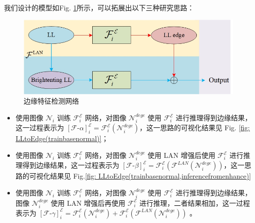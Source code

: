 \documentclass[a4paper]{ctexart}
\begin{document}
		我们设计的模型如Fig. \ref{fig: DCMP}所示，可以拓展出以下三种研究思路：
		
		\begin{figure}[htbp]
			\centering
			\includegraphics[width=0.5\linewidth]{picture/Edge Detection/DCMP}
			\caption{边缘特征检测网络}
			\label{fig: DCMP}
		\end{figure}
		
		\begin{itemize}
			\item[1)]
			使用图像 $\mathcal{N}_{i}$ 训练 $\mathcal{F}_{i}^{\mathcal{E}}$ 网络，对图像 $\mathcal{N}_{i}^{dege}$ 使用 $\mathcal{F}_{i}^{\mathcal{E}}$ 进行推理得到边缘结果，这一过程表示为 ${\left[\mathcal{F}\text{-}\alpha\right]}^{\mathcal{E}}_i = {\mathcal{F}}^\mathcal{E}_{i} (\mathcal{N}_{i}^{dege})$，这一思路的可视化结果见 Fig. \ref{fig: LLtoEdge(trainbasenormal)}；
			
			\item[2)]
			使用图像 $\mathcal{N}_{i}$ 训练 $\mathcal{F}_{i}^{\mathcal{E}}$ 网络，对图像 $\mathcal{N}_{i}^{dege}$ 使用 LAN 增强后使用 $\mathcal{F}_{i}^{\mathcal{E}}$ 进行推理得到边缘结果，这一过程表示为 ${\left[\mathcal{F}\text{-}\beta\right]}^{\mathcal{E}}_i =  \mathcal{F}_{i}^{\mathcal{E}} \left(\mathcal{F}^{LAN} (\mathcal{N}_{i}^{dege})\right)$，这一思路的可视化结果见 Fig.\ref{fig: LLtoEdge(trainbasenormal,inferencefromenhance)}
			
			\item[3)]
			使用图像 $\mathcal{N}_{i}$ 训练 $\mathcal{F}_{i}^{\mathcal{E}}$ 网络，对图像 $\mathcal{N}_{i}^{dege}$ 使用 $\mathcal{F}_{i}^{\mathcal{E}}$ 进行推理得到边缘结果，图像 $\mathcal{N}_{i}^{dege}$ 使用 LAN 增强后再使用 $\mathcal{F}_{i}^{\mathcal{E}}$ 进行推理，二者结果相加，这一过程表示为 ${\left[\mathcal{F}\text{-}\gamma\right]}^{\mathcal{E}}_i = \mathcal{F}_{i}^{\mathcal{E}} (\mathcal{N}_{i}^{dege}) + \mathcal{F}_{i}^{\mathcal{E}} \left(\mathcal{F}^{LAN} (\mathcal{N}_{i}^{dege})\right)$ 。
		\end{itemize}
		
\end{document}
